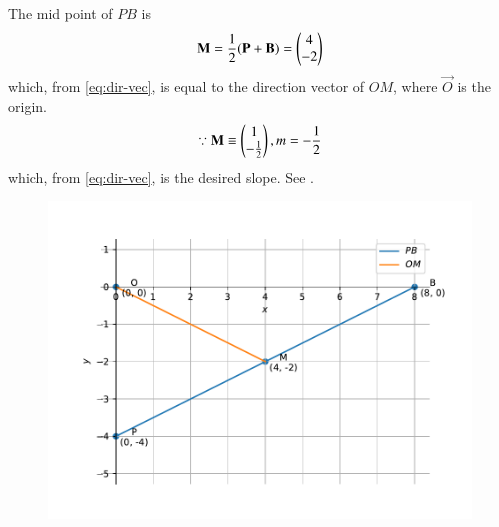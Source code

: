 The mid point of $PB$ is
\begin{align}
\mathbf{M} =\frac{1}{2}(\mathbf{P}+\mathbf{B})
	= \begin{pmatrix}4 \\ -2\end{pmatrix}  
\end{align}
which, from  \eqref{eq:dir-vec}, is equal to the direction vector of $OM$, where $\vec{O}$ is the origin.
\begin{align}
\because \mathbf{M} \equiv
	 \begin{pmatrix}1 \\ -\frac{1}{2}\end{pmatrix},
	m = -\frac{1}{2}
\end{align}
which, from \eqref{eq:dir-vec},  is the desired slope.
See 
		.
	\begin{figure}[H]
		\centering
 \includegraphics[width=0.75\columnwidth]{chapters/11/10/1/5/figs/fig.pdf}
		\caption{}
		\label{fig:11/10/1/5}
  	\end{figure}
